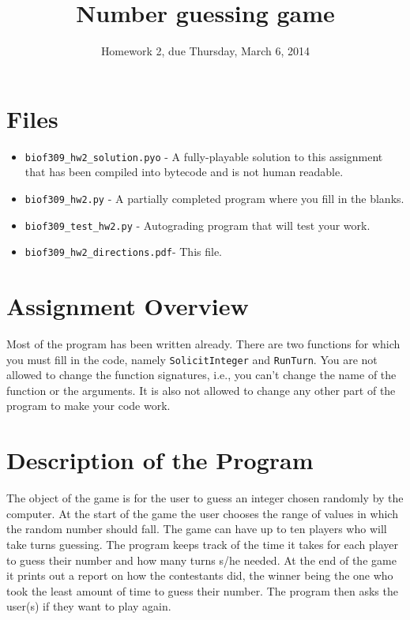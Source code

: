 \documentclass[11pt]{amsart}
\title{Number guessing game}
\author{Homework 2, due Thursday, March 6, 2014}
\begin{document}
\maketitle

\section*{Files}
\begin{itemize}
  \item \texttt{biof309_hw2_solution.pyo} -  A fully-playable solution to this assignment that has been compiled into bytecode and is not human readable.
  \item \texttt{biof309_hw2.py} - A partially completed program where you fill in the blanks.
  \item \texttt{biof309_test_hw2.py} - Autograding program that will test your work.
  \item \texttt{biof309_hw2_directions.pdf}- This file.
\end{itemize}

\section*{Assignment Overview}
Most of the program has been written already. There are two functions for which you must fill in the code, namely \texttt{SolicitInteger} and \texttt{RunTurn}. You are not allowed to change the function signatures, i.e.,  you can't change the name of the function or the arguments. It is also not allowed to change any other part of the program to make your code work.

\section*{Description of the Program}
The object of the game is for the user to guess an integer chosen randomly by the computer. At the start of the game the user chooses the range of values in which the random number should fall. The game can have up to ten players who will take turns guessing. The program keeps track of the time it takes for each player to guess their number and how many turns s/he needed.  At the end of the game it prints out a report on how the contestants did, the winner being the one who took the least amount of time to guess their number. The program then asks the user(s) if they want to play again.
\end{document}
